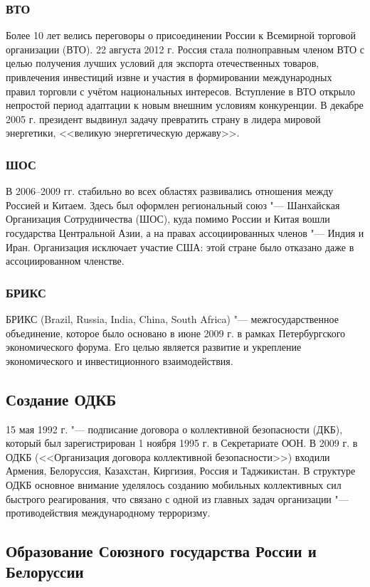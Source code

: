 \subsubsection{ВТО}
Более 10 лет велись переговоры о присоединении России к Всемирной торговой организации (ВТО). 22 августа 2012 г. Россия стала полноправным членом ВТО с целью получения лучших условий для экспорта отечественных товаров, привлечения инвестиций извне и участия в формировании международных правил торговли с учётом национальных интересов. Вступление в ВТО открыло непростой период адаптации к новым внешним условиям конкуренции. В декабре 2005 г. президент выдвинул задачу превратить страну в лидера мировой энергетики, <<великую энергетическую державу>>.

\subsubsection{ШОС}
В 2006--2009 гг. стабильно во всех областях развивались отношения между Россией и Китаем. Здесь был оформлен региональный союз "--- Шанхайская Организация Сотрудничества (ШОС), куда помимо России и Китая вошли государства Центральной Азии, а на правах ассоциированных членов "--- Индия и Иран. Организация исключает участие США: этой стране было отказано даже в ассоциированном членстве.  

\subsubsection{БРИКС}
БРИКС (Brazil, Russia, India, China, South Africa) "--- межгосударственное объединение, которое было основано в июне 2009 г. в рамках Петербургского экономического форума. Его целью является развитие и укрепление экономического и инвестиционного взаимодействия.

\subsection{Создание ОДКБ}
15 мая 1992 г. "--- подписание договора о коллективной безопасности (ДКБ), который был зарегистрирован 1 ноября 1995 г. в Секретариате ООН. В 2009 г. в ОДКБ (<<Организация договора коллективной безопасности>>) входили Армения, Белоруссия, Казахстан, Киргизия, Россия и Таджикистан. В структуре ОДКБ основное внимание уделялось созданию мобильных коллективных сил быстрого реагирования, что связано с одной из главных задач организации "--- противодействия международному терроризму.
\subsection{Образование Союзного государства России и Белоруссии}

